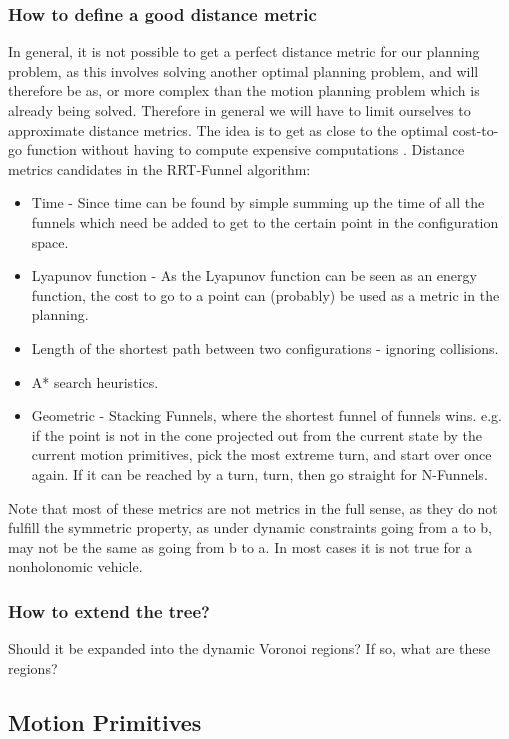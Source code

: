 \subsubsection{How to define a good distance metric}
In general, it is not possible to get a perfect distance metric for our planning
problem, as this involves solving another optimal planning problem, and will
therefore be as, or more complex than the motion planning problem which is
already being solved. Therefore in general we will have to limit ourselves to
approximate distance metrics. The idea is to get as close to the optimal
cost-to-go function without having to compute expensive computations \cite{LaValle09}.
Distance metrics candidates in the RRT-Funnel algorithm:
\begin{itemize}
  \item Time - Since time can be found by simple summing up the time of all the
    funnels which need be added to get to the certain point in the configuration space.
  \item Lyapunov function - As the Lyapunov function can be seen as an energy
    function, the cost to go to a point can (probably) be used as a metric in
    the planning.
  \item Length of the shortest path between two configurations - ignoring collisions.
  \item A* search heuristics.
  \item Geometric - Stacking Funnels, where the shortest funnel of funnels wins.
    e.g. if the point is not in the cone projected out from the current state by
    the current motion primitives, pick the most extreme turn, and start over
    once again. If it can be reached by a turn, turn, then go straight for N-Funnels.
\end{itemize}

Note that most of these metrics are not metrics in the full sense, as they do
not fulfill the symmetric property, as under dynamic constraints going from a to
b, may not be the same as going from b to a. In most cases it is not true for a
nonholonomic vehicle.

\subsubsection{How to extend the tree?}

Should it be expanded into the dynamic Voronoi regions? If so, what are these regions?


\subsection{Motion Primitives}

